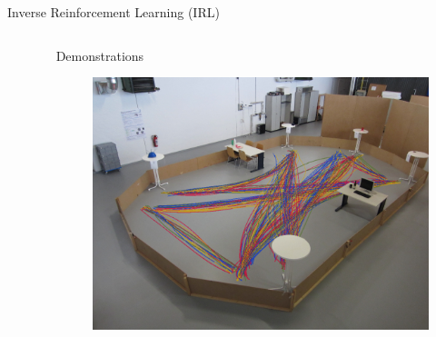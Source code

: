 \documentclass{beamer}
\begin{document}
\begin{frame}{Inverse Reinforcement Learning (IRL)}
\begin{columns}
\begin{column}{0.2\textwidth}
\begin{figure}
      \end{figure}
    \end{column}
    \begin{column}{0.8\textwidth}
      Demonstrations
      \begin{figure}
        \centering
        \includegraphics[width=\textwidth]{images/image-013.png}
      \end{figure}
    \end{column}
  \end{columns}
  \begin{spacing}{0.5}
    {\tiny\color{gray}}
  \end{spacing}
\end{frame}
\end{document}
